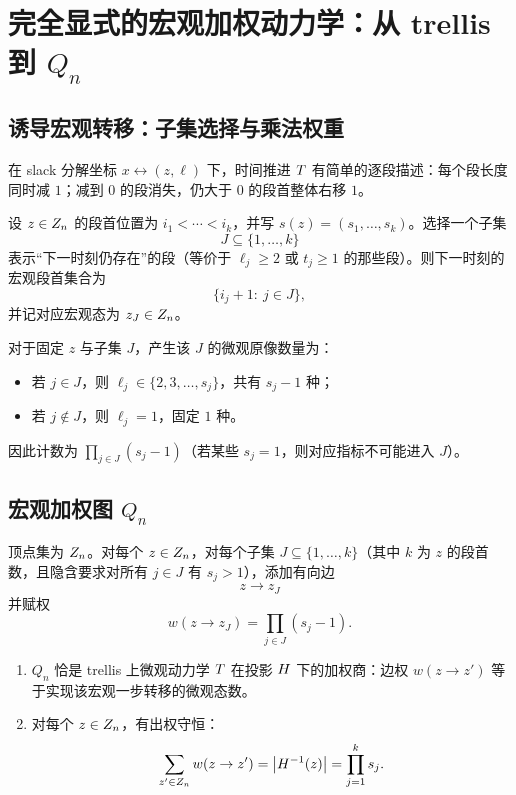 
\section{完全显式的宏观加权动力学：从 trellis 到 $Q_n$}

\subsection{诱导宏观转移：子集选择与乘法权重}

在 slack 分解坐标 $x\leftrightarrow (z,\ell)$ 下，时间推进 $T$ 有简单的逐段描述：每个段长度同时减 $1$；减到 $0$ 的段消失，仍大于 $0$ 的段首整体右移 $1$。

设 $z\in Z_n$ 的段首位置为 $i_1<\cdots<i_k$，并写 $s(z)=(s_1,\ldots,s_k)$。选择一个子集
$$
J\subseteq \{1,\ldots,k\}
$$
表示“下一时刻仍存在”的段（等价于 $\ell_j\ge 2$ 或 $t_j\ge 1$ 的那些段）。则下一时刻的宏观段首集合为
$$
\{i_j+1:\ j\in J\},
$$
并记对应宏观态为 $z_J\in Z_n$。

对于固定 $z$ 与子集 $J$，产生该 $J$ 的微观原像数量为：
\begin{itemize}
  \item 若 $j\in J$，则 $\ell_j\in\{2,3,\ldots,s_j\}$，共有 $s_j-1$ 种；
  \item 若 $j\notin J$，则 $\ell_j=1$，固定 $1$ 种。
\end{itemize}
因此计数为 $\prod_{j\in J}(s_j-1)$（若某些 $s_j=1$，则对应指标不可能进入 $J$）。

\subsection{宏观加权图 $Q_n$}

\begin{definition}[宏观加权转移图 $Q_n$]\label{def:Qn}
顶点集为 $Z_n$。对每个 $z\in Z_n$，对每个子集 $J\subseteq\{1,\ldots,k\}$（其中 $k$ 为 $z$ 的段首数，且隐含要求对所有 $j\in J$ 有 $s_j>1$），添加有向边
$$
z\to z_J
$$
并赋权
$$
w(z\to z_J)=\prod_{j\in J}(s_j-1).
$$
\end{definition}

\begin{theorem}[子集—权重闭式公式与守恒]\label{thm:Qn_closed_form}
\begin{enumerate}
  \item $Q_n$ 恰是 trellis 上微观动力学 $T$ 在投影 $H$ 下的加权商：边权 $w(z\to z')$ 等于实现该宏观一步转移的微观态数。
  \item 对每个 $z\in Z_n$，有出权守恒：
  $$
  \sum_{z'\in Z_n} w(z\to z')=\left\lvert H^{-1}(z)\right\rvert=\prod_{j=1}^k s_j.
  $$
\end{enumerate}
\end{theorem}

